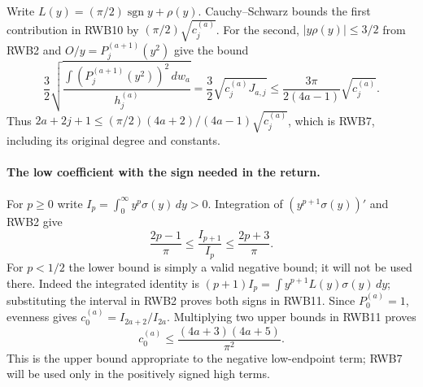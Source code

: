 Write $L(y)=(\pi/2)\operatorname{sgn}y+\rho(y)$.
Cauchy--Schwarz bounds the first contribution in RWB10 by
$(\pi/2)\sqrt{c_j^{(a)}}$. For the second, $|y\rho(y)|\le3/2$
from RWB2 and $O/y=P_j^{(a+1)}(y^2)$ give the bound
\[
 \frac32\sqrt{
 \frac{\int(P_j^{(a+1)}(y^2))^2\,dw_a}{h_j^{(a)}}}
 =\frac32\sqrt{c_j^{(a)}J_{a,j}}
 \le\frac{3\pi}{2(4a-1)}\sqrt{c_j^{(a)}}.
\]
Thus $2a+2j+1\le(\pi/2)(4a+2)/(4a-1)\sqrt{c_j^{(a)}}$,
which is RWB7, including its original degree and constants.

\paragraph{The low coefficient with the sign needed in the return.}
For $p\ge0$ write $I_p=\int_0^\infty y^p\sigma(y)\,dy>0$.
Integration of $(y^{p+1}\sigma(y))'$ and RWB2 give
\[
 \frac{2p-1}{\pi}\le\frac{I_{p+1}}{I_p}
 \le\frac{2p+3}{\pi}.
 \tag{RWB11}
\]
For $p<1/2$ the lower bound is simply a valid negative bound; it will
not be used there. Indeed the integrated identity is
$(p+1)I_p=\int y^{p+1}L(y)\sigma(y)\,dy$; substituting the interval
in RWB2 proves both signs in RWB11. Since $P_0^{(a)}=1$, evenness
gives $c_0^{(a)}=I_{2a+2}/I_{2a}$. Multiplying two upper bounds in
RWB11 proves
\[
 \boxed{\displaystyle c_0^{(a)}\le
 \frac{(4a+3)(4a+5)}{\pi^2}.}
 \tag{RWB12}
\]
This is the upper bound appropriate to the negative low-endpoint term;
RWB7 will be used only in the positively signed high terms.

